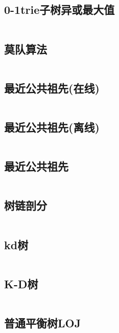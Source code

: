 \inputminted{cpp}{code/interval_xor_max.cc}

\subsection{0-1trie子树异或最大值} 

\inputminted{cpp}{code/tree_xor_max.cc}

\subsection{莫队算法} 

\inputminted{cpp}{code/mo.cc}

\subsection{最近公共祖先(在线)} 

\inputminted{cpp}{code/LCAonline.cc}

\subsection{最近公共祖先(离线)} 

\inputminted{cpp}{code/LCAoffline.cc}

\subsection{最近公共祖先} 

\inputminted{cpp}{code/LCAwanggann.cc}

\subsection{树链剖分} 

\inputminted{cpp}{code/heavy_light_decomposition.cpp}

\subsection{kd树} 

\inputminted{cpp}{code/kd树.cc}

\subsection{K-D树} 

\inputminted{cpp}{code/KDTree.cc}

\subsection{普通平衡树LOJ} 


